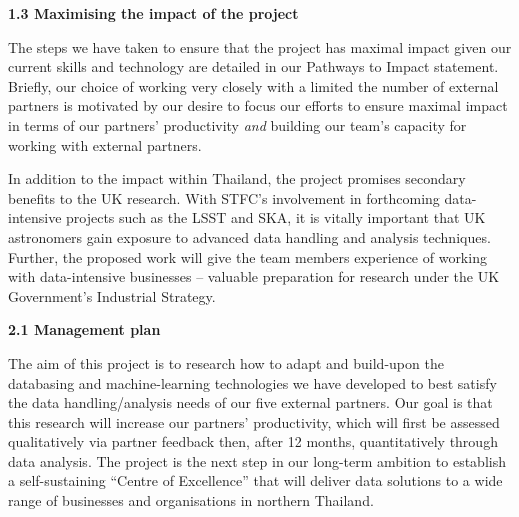 \documentclass[11pt]{article}
\begin{document}
  \vspace{3mm}
  \noindent
  {\large \bf 1.3 Maximising the impact of the project}
  
  \noindent
  The steps we have taken to ensure that the project has maximal impact given our current skills and technology are detailed in our Pathways to Impact statement. Briefly, our choice of working very closely with a limited the number of external partners is motivated by our desire to focus our efforts to ensure maximal impact in terms of our partners' productivity {\it and} building our team's capacity for working with external partners. 
  
  \vspace{2mm}
  \noindent
  In addition to the impact within Thailand, the project promises secondary benefits to the UK research. With STFC's involvement in forthcoming data-intensive projects such as the LSST and SKA, it is vitally important that UK astronomers gain exposure to advanced data handling and analysis techniques. Further, the proposed work will give the team members experience of working with data-intensive businesses -- valuable preparation for research under the UK Government's Industrial Strategy.
  
  \vspace{3mm}
  \noindent
  {\large \bf 2.1 Management plan}
  
  \noindent
  The aim of this project is to research how to adapt and build-upon the databasing and machine-learning technologies we have developed to best satisfy the data handling/analysis needs of our five external partners. Our goal is that this research will increase our partners' productivity, which will first be assessed qualitatively via partner feedback then, after 12 months, quantitatively through data analysis. The project is the next step in our long-term ambition to establish a self-sustaining ``Centre of Excellence'' that will deliver data solutions to a wide range of businesses and organisations in northern Thailand.
  
\end{document}
